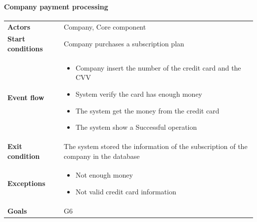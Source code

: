 \paragraph{Company payment processing}
\begin{center}
\begin{table}[H]
\centering
\begin{tabular}{l|p{}}
\textbf{Actors} & Company, Core component \\
\textbf{Start conditions} & Company purchases a subscription plan \\
\textbf{Event flow}  & \begin{minipage}[t]{0.7\textwidth}
    \begin{itemize}
       \item Company insert the number of the credit card and the CVV
\item System verify the card has enough money
\item The system get the money from the credit card
\item The system show a Successful operation 


    \end{itemize}
    
\end{minipage} \\
\textbf{Exit condition} & The system stored the information of the subscription of the company in the database \\
\textbf{Exceptions} & \begin{minipage}[t]{0.7\textwidth}
    \begin{itemize}
       \item Not enough money
        \item Not valid credit card information
    \end{itemize}
    
\end{minipage} \\
\textbf{Goals} & G6 
\end{tabular}

\end{table}
\end{center}


